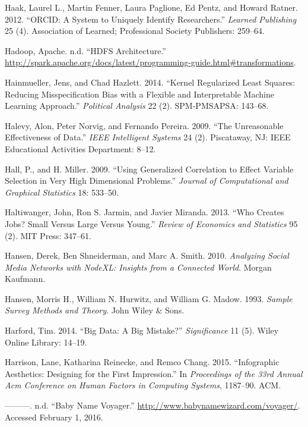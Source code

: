 \documentclass[]{krantz}
\begin{document}
\hypertarget{ref-haak2012orcid}{}
Haak, Laurel L., Martin Fenner, Laura Paglione, Ed Pentz, and Howard
Ratner. 2012. ``ORCID: A System to Uniquely Identify Researchers.''
\emph{Learned Publishing} 25 (4). Association of Learned; Professional
Society Publishers: 259--64.

\hypertarget{ref-SparkTransformation}{}
Hadoop, Apache. n.d. ``HDFS Architecture.''
\url{http://spark.apache.org/docs/latest/programming-guide.html\#transformations}.

\hypertarget{ref-hainmueller2014kernel}{}
Hainmueller, Jens, and Chad Hazlett. 2014. ``Kernel Regularized Least
Squares: Reducing Misspecification Bias with a Flexible and
Interpretable Machine Learning Approach.'' \emph{Political Analysis} 22
(2). SPM-PMSAPSA: 143--68.

\hypertarget{ref-halevy-09}{}
Halevy, Alon, Peter Norvig, and Fernando Pereira. 2009. ``The
Unreasonable Effectiveness of Data.'' \emph{IEEE Intelligent Systems} 24
(2). Piscataway, NJ: IEEE Educational Activities Department: 8--12.

\hypertarget{ref-HallMiller2009}{}
Hall, P., and H. Miller. 2009. ``Using Generalized Correlation to Effect
Variable Selection in Very High Dimensional Problems.'' \emph{Journal of
Computational and Graphical Statistics} 18: 533--50.

\hypertarget{ref-haltiwanger2013creates}{}
Haltiwanger, John, Ron S. Jarmin, and Javier Miranda. 2013. ``Who
Creates Jobs? Small Versus Large Versus Young.'' \emph{Review of
Economics and Statistics} 95 (2). MIT Press: 347--61.

\hypertarget{ref-hansen2010analyzing}{}
Hansen, Derek, Ben Shneiderman, and Marc A. Smith. 2010. \emph{Analyzing
Social Media Networks with NodeXL: Insights from a Connected World}.
Morgan Kaufmann.

\hypertarget{ref-hansen1993sample}{}
Hansen, Morris H., William N. Hurwitz, and William G. Madow. 1993.
\emph{Sample Survey Methods and Theory}. John Wiley \& Sons.

\hypertarget{ref-harford2014big}{}
Harford, Tim. 2014. ``Big Data: A Big Mistake?'' \emph{Significance} 11
(5). Wiley Online Library: 14--19.

\hypertarget{ref-harrison2015infographic}{}
Harrison, Lane, Katharina Reinecke, and Remco Chang. 2015. ``Infographic
Aesthetics: Designing for the First Impression.'' In \emph{Proceedings
of the 33rd Annual Acm Conference on Human Factors in Computing
Systems}, 1187--90. ACM.

\hypertarget{ref-babynamevoyager}{}
---------. n.d. ``Baby Name Voyager.''
\url{http://www.babynamewizard.com/voyager/}. Accessed February 1, 2016.
\end{document}
